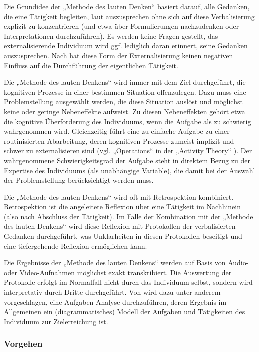 Die Grundidee der „Methode des lauten Denken“ basiert darauf, alle Gedanken, die eine Tätigkeit begleiten, laut auszusprechen ohne sich auf diese Verbalisierung explizit zu konzentrieren (und etwa über Formulierungen nachzudenken oder Interpretationen durchzuführen). Es werden keine Fragen gestellt, das externalisierende Individuum wird ggf. lediglich daran erinnert, seine Gedanken auszusprechen. Nach \citet{Van-Someren94} hat diese Form der Externalisierung keinen negativen Einfluss auf die Durchführung der eigentlichen Tätigkeit.

Die „Methode des lauten Denkens“ wird immer mit dem Ziel durchgeführt, die kognitiven Prozesse in einer bestimmen Situation offenzulegen. Dazu muss eine Problemstellung ausgewählt werden, die diese Situation auslöst und möglichst keine oder geringe Nebeneffekte aufweist. Zu diesen Nebeneffekten gehört etwa die kognitive Überforderung des Individuums, wenn die Aufgabe als zu schwierig wahrgenommen wird. Gleichzeitig führt eine zu einfache Aufgabe zu einer routinisierten Abarbeitung, deren kognitiven Prozesse zumeist implizit und schwer zu externalisieren sind (vgl. „Operations“ in der „Activity Theory“ \citep{Leontev78}). Der wahrgenommene Schwierigkeitsgrad der Aufgabe steht in direktem Bezug zu der Expertise des Individuums (als unabhängige Variable), die damit bei der Auswahl der Problemstellung berücksichtigt werden muss.

Die „Methode des lauten Denkens“ wird oft mit Retrospektion kombiniert. Retrospektion ist die angeleitete Reflexion über eine Tätigkeit im Nachhinein (also nach Abschluss der Tätigkeit). Im Falle der Kombination mit der „Methode des lauten Denkens“ wird diese Reflexion mit Protokollen der verbalisierten Gedanken durchgeführt, was Unklarheiten in diesen Protokollen beseitigt und eine tiefergehende Reflexion ermöglichen kann. 

Die Ergebnisse der „Methode des lauten Denkens“ werden auf Basis von Audio- oder Video-Aufnahmen möglichst exakt transkribiert. Die Auswertung der Protokolle erfolgt im Normalfall nicht durch das Individuum selbst, sondern wird interpretativ durch Dritte durchgeführt. Von \citet{Van-Someren94} wird dazu unter anderem vorgeschlagen, eine Aufgaben-Analyse durchzuführen, deren Ergebnis im Allgemeinen ein (diagrammatisches) Modell der Aufgaben und Tätigkeiten des Individuum zur Zielerreichung ist.

\subsubsection{Vorgehen}

